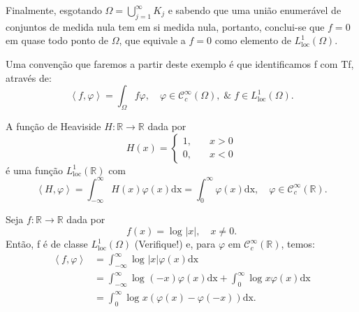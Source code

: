 \documentclass[../distribution_theory_notes.tex]{subfiles}
\begin{document}
\begin{proof*}
                  Finalmente, esgotando \(\Omega = \bigcup_{j=1}^{\infty}K_{j}\) e sabendo que uma união enumerável de conjuntos de medida nula tem em si medida nula, portanto, conclui-se que \(f=0\) em quase todo ponto de \(\Omega \), que equivale a \(f=0\) como elemento de \(L_{\mathrm{loc}}^{1}(\Omega )\). \qedsymbol
                  \end{proof*}

                  Uma convenção que faremos a partir deste exemplo é que identificamos f com Tf, através de:
                    \[
                      \left< f, \varphi  \right>= \int_{\Omega }^{}f\varphi , \quad \varphi \in \mathcal{C}_{c}^{\infty}(\Omega ),\;\&\; f\in L_{\mathrm{loc}}^{1}(\Omega ).
                    \]

                    \begin{example}
                     A \hypertarget{heaviside_function}{função de Heaviside} \(H:\mathbb{R}\rightarrow \mathbb{R}\) dada por 
                       \[
                         H(x) = \left\{\begin{array}{ll}
                             1,&\quad x>0\\ 
                            0,&\quad x<0
                           \end{array}\right.
                       \]
                       é uma função \(L_{\mathrm{loc}}^{1}(\mathbb{R})\) com 
                         \[
                           \left< H, \varphi  \right>=\int_{-\infty}^{\infty}H(x)\varphi (x) \mathrm{dx}=\int_{0}^{\infty}\varphi (x) \mathrm{dx},\quad \varphi \in \mathcal{C}_{c}^{\infty}(\mathbb{R}).
                         \]
                   \end{example}

                   \begin{example}[Logaritmo]
                    Seja \(f:\mathbb{R}\rightarrow \mathbb{R}\) dada por 
                      \[
                        f(x)=\log^{}{| x |},\quad x\neq 0.
                      \]
                      Então, f é de classe \(L_{\mathrm{loc}}^{1}(\Omega )\) (Verifique!) e, para \(\varphi \) em \(\mathcal{C}_{c}^{\infty}(\mathbb{R})\), temos: 
                     \begin{align*}
                       \left< f, \varphi  \right> &= \int_{-\infty}^{\infty}\log^{}{| x |}\varphi (x) \mathrm{dx}\\ 
                                                  &= \int_{-\infty}^{\infty}\log^{}{(-x)}\varphi (x) \mathrm{dx} + \int_{0}^{\infty}\log^{}{x}\varphi (x) \mathrm{dx}\\ 
                                                  &= \int_{0}^{\infty}\log^{}{x}(\varphi (x)-\varphi (-x)) \mathrm{dx}.
                     \end{align*}
                   \end{example}
\end{document}
